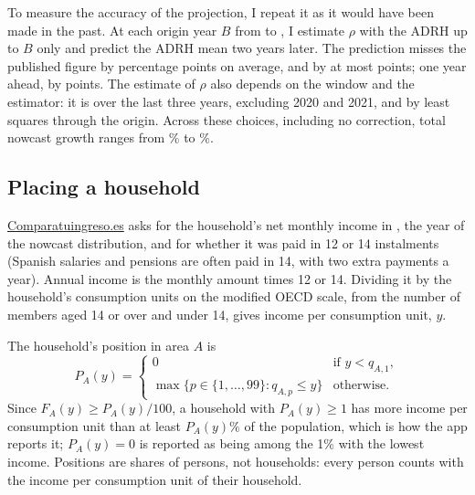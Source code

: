 To measure the accuracy of the projection, I repeat it as it would have been made in the past. At each origin year $B$ from \NowcastBtFirst{} to \NowcastBtLast{}, I estimate $\rho$ with the ADRH up to $B$ only and predict the ADRH mean two years later. The prediction misses the published figure by \NowcastBtMAE{} percentage points on average, and by at most \NowcastBtMax{} points; one year ahead, by \NowcastBtOneMAE{} points. The estimate of $\rho$ also depends on the window and the estimator: it is \RhoLastThree{} over the last three years, \RhoExclCovid{} excluding 2020 and 2021, and \RhoOrigin{} by least squares through the origin. Across these choices, including no correction, total nowcast growth ranges from \NowcastGrowthMin{}\% to \NowcastGrowthMax{}\%.

\subsection{Placing a household}\label{sec:placing}

\href{https://comparatuingreso.es/}{\mbox{Comparatuingreso.es}} asks for the household's net monthly income in \TargetYear{}, the year of the nowcast distribution, and for whether it was paid in 12 or 14 instalments (Spanish salaries and pensions are often paid in 14, with two extra payments a year). Annual income is the monthly amount times 12 or 14. Dividing it by the household's consumption units on the modified OECD scale, from the number of members aged 14 or over and under 14, gives income per consumption unit, $y$.

The household's position in area $A$ is
\begin{equation}
P_A(y) =
\begin{cases}
0 & \text{if } y < q_{A,1}, \\
\max\{p \in \{1, \dots, 99\} : q_{A,p} \le y\} & \text{otherwise.}
\end{cases}
\end{equation}
Since $F_A(y) \ge P_A(y)/100$, a household with $P_A(y) \ge 1$ has more income per consumption unit than at least $P_A(y)\%$ of the population, which is how the app reports it; $P_A(y) = 0$ is reported as being among the 1\% with the lowest income. Positions are shares of persons, not households: every person counts with the income per consumption unit of their household.
